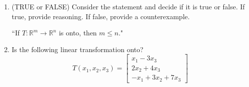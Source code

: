 \documentclass[14pt]{article}
\begin{document}
\begin{enumerate}
\begin{center}
\end{center}

\item (TRUE or FALSE) Consider the statement and decide if it is true or false.  If true, provide reasoning.  If false, provide a counterexample.
\begin{center}
``If $ T\colon \mathbb{R}^m \rightarrow \mathbb{R}^n $ is onto, then $ m \leq n $."
\end{center}

\item  Is the following linear transformation onto?
\[
T(x_1,x_2,x_3) = \left[\begin{array}{c} x_1-3x_3 \\ 2x_2+4x_3 \\ -x_1 +3x_2+7x_3\end{array}\right]
\]






\end{enumerate}
\end{document}
